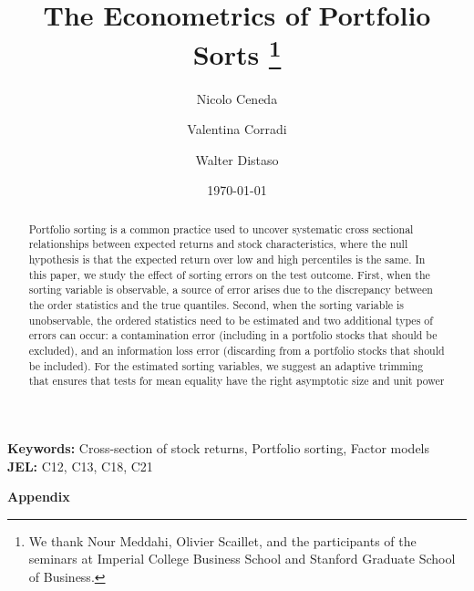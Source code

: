 \documentclass[11pt, a4paper]{article}
\title{\LARGE\bf The Econometrics of Portfolio Sorts
\thanks{We thank Nour Meddahi, Olivier Scaillet, and the participants of the seminars at Imperial College Business School and Stanford Graduate School of Business.}}
\date{\today}
\author[1]{Nicolo Ceneda}
\author[2]{Valentina Corradi}
\author[1]{Walter Distaso}
\affil[1]{\it\small Department of Finance, Imperial College London}
\affil[2]{\it\small Department of Economics, New York University Abu Dhabi}
\begin{document}

\maketitle

\begin{abstract}
    Portfolio sorting is a common practice used to uncover systematic cross sectional relationships between expected returns and stock characteristics, where the null hypothesis is that the expected return over low and high percentiles is the same. In this paper, we study the effect of sorting errors on the test outcome. First, when the sorting variable is observable, a source of error arises due to the discrepancy between the order statistics and the true quantiles. Second, when the sorting variable is unobservable, the ordered statistics need to be estimated and two additional types of errors can occur: a contamination error (including in a portfolio stocks that should be excluded), and an information loss error (discarding from a portfolio stocks that should be included). For the estimated sorting variables, we suggest an adaptive trimming that ensures that tests for mean equality have the right asymptotic size and unit power
\end{abstract}

\vspace{0.5cm}
\noindent \small{\textbf{Keywords:} Cross-section of stock returns, Portfolio sorting, Factor models} \\
\noindent \small{\textbf{JEL:} C12, C13, C18, C21}


\clearpage


%
%
%
%
%


\clearpage
\appendix

\begin{center}
	{\Large\bf Appendix}
\end{center}

\renewcommand{\theequation}{A.\arabic{equation}}
\setcounter{equation}{0}


%
%
%



\clearpage



\end{document}
